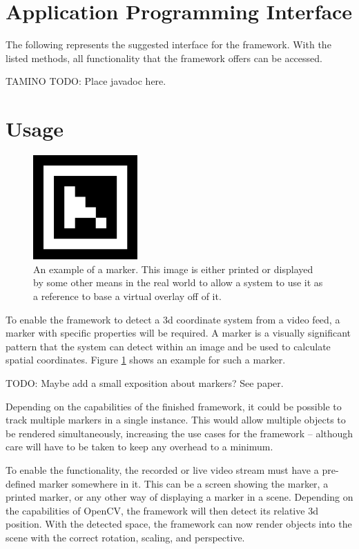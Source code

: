 \section{Application Programming Interface}

The following represents the suggested interface for the framework.
With the listed methods, all functionality that the framework offers can be accessed.

TAMINO TODO: Place javadoc here.

\section{Usage}

\begin{figure}
	\centering
	\includegraphics[width=4cm]{img/marker_example.png}
	\caption[Example Marker.]{An example of a marker. This image is either printed or displayed by some other means in the real world to allow a system to use it as a reference to base a virtual overlay off of it.}
	\label{fig:marker_example}
\end{figure}

To enable the framework to detect a 3d coordinate system from a video feed, a marker with specific properties will be required.
A marker is a visually significant pattern that the system can detect within an image and be used to calculate spatial coordinates. Figure \ref{fig:marker_example} shows an example for such a marker.

TODO: Maybe add a small exposition about markers? See paper.

Depending on the capabilities of the finished framework, it could be possible to track multiple markers in a single instance.
This would allow multiple objects to be rendered simultaneously, increasing the use cases for the framework – although care will have to be taken to keep any overhead to a minimum.

To enable the functionality, the recorded or live video stream must have a pre-defined marker somewhere in it.
This can be a screen showing the marker, a printed marker, or any other way of displaying a marker in a scene.
Depending on the capabilities of OpenCV, the framework will then detect its relative 3d position.
With the detected space, the framework can now render objects into the scene with the correct rotation, scaling, and perspective.

